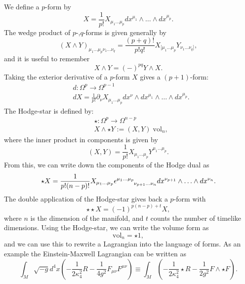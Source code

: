 We define a $p$-form by
\begin{equation*}
	X = \frac{1}{p!} X_{\mu_1 \ldots \mu_p} dx^{\mu_1} \wedge \ldots \wedge dx^{\mu_p}.
\end{equation*}
The wedge product of $p$-,$q$-forms is given generally by
\begin{equation*}
	(X \wedge Y)_{\mu_1 \ldots \mu_p \nu_1 \ldots \nu_q} = \frac{(p+q)!}{p! q!} X_{[\mu_1 \ldots \mu_p } Y_{\nu_1 \ldots \nu_q]},
\end{equation*}
and it is useful to remember
\begin{equation}
\label{eq:pqswap}
	X \wedge Y = (-)^{pq} Y \wedge X.
\end{equation}
Taking the exterior derivative of a $p$-form $X$ gives a $(p+1)$-form:
\begin{equation*}
\begin{aligned}
	&d : \Omega^p \to \Omega^{p -1} \\
	&dX = \frac{1}{p!} \partial_\nu X_{\mu_1 \ldots \mu_p} dx^{\nu} \wedge dx^{\mu_1} \wedge \ldots \wedge dx^{\mu_p}.
\end{aligned}
\end{equation*}
The Hodge-star is defined by:
\begin{equation*}
\begin{aligned}
	&\star : \Omega^p \to \Omega^{n - p} \\
	&X \wedge \star Y := (X, Y) \; \text{vol}_n,
\end{aligned}
\end{equation*}
where the inner product in components is given by
\begin{equation*}
	(X, Y) = \frac{1}{p!} X_{\mu_1 \ldots \mu_p} Y^{\mu_1 \ldots \mu_p}. 
\end{equation*}
From this, we can write down the components of the Hodge dual as
\begin{equation*}
	\star X = \frac{1}{p! (n - p)!} X_{\mu_1 \ldots \mu_p} \tensor{\et}{^{\mu_1 \ldots \mu_p}_{\nu_{p+1} \ldots \nu_n}} dx^{\nu_{p+1}} \wedge \ldots \wedge dx^{\nu_n}.
\end{equation*}
The double application of the Hodge-star gives back a $p$-form with
\begin{equation*}
	\star \star X = (-1)^{p(n-p) + t} X,
\end{equation*}
where $n$ is the dimension of the manifold, and $t$ counts the number of timelike dimensions. Using the Hodge-star, we can write the volume form as 
\begin{equation*}
	\text{vol}_n = \star 1,
\end{equation*}
and we can use this to rewrite a Lagrangian into the language of forms. As an example the Einstein-Maxwell Lagrangian can be written as
\begin{equation*}
	\int_M \sqrt{-g} d^4 x \left(- \frac{1}{2 \kappa_4^2} R - \frac{1}{4 g^2} F_{\mu \nu} F^{\mu \nu} \right) \equiv \int_M  \left(- \frac{1}{2 \kappa_4^2} \star R - \frac{1}{2 g^2} F \wedge \star F \right).
\end{equation*}


